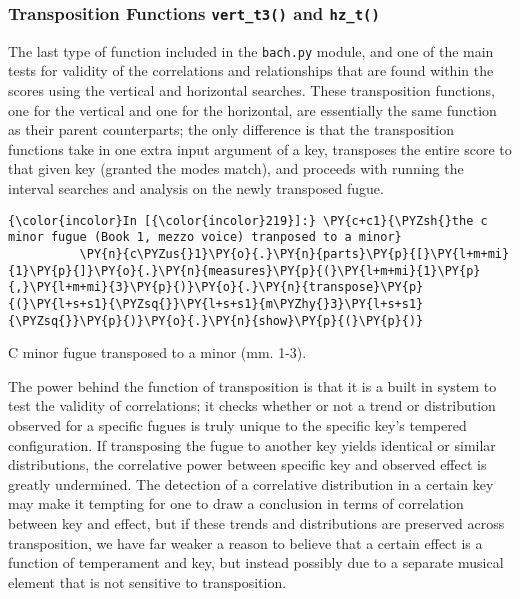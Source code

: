 \subsubsection{\texorpdfstring{Transposition Functions
\texttt{vert\_t3()} and
\texttt{hz\_t()}}{Transposition Functions vert\_t3() and hz\_t()}}\label{transposition-functions-vert_t3-and-hz_t}

The last type of function included in the \texttt{bach.py} module, and
one of the main tests for validity of the correlations and relationships
that are found within the scores using the vertical and horizontal
searches. These transposition functions, one for the vertical and one
for the horizontal, are essentially the same function as their parent
counterparts; the only difference is that the transposition functions
take in one extra input argument of a key, transposes the entire score
to that given key (granted the modes match), and proceeds with running
the interval searches and analysis on the newly transposed fugue.


    \begin{Verbatim}[commandchars=\\\{\}]
{\color{incolor}In [{\color{incolor}219}]:} \PY{c+c1}{\PYZsh{}the c minor fugue (Book 1, mezzo voice) tranposed to a minor}
          \PY{n}{c\PYZus{}1}\PY{o}{.}\PY{n}{parts}\PY{p}{[}\PY{l+m+mi}{1}\PY{p}{]}\PY{o}{.}\PY{n}{measures}\PY{p}{(}\PY{l+m+mi}{1}\PY{p}{,}\PY{l+m+mi}{3}\PY{p}{)}\PY{o}{.}\PY{n}{transpose}\PY{p}{(}\PY{l+s+s1}{\PYZsq{}}\PY{l+s+s1}{m\PYZhy{}3}\PY{l+s+s1}{\PYZsq{}}\PY{p}{)}\PY{o}{.}\PY{n}{show}\PY{p}{(}\PY{p}{)}
\end{Verbatim}

\begin{Example}[H]
    \begin{center}
    \caption{ C minor fugue transposed to a minor (mm. 1-3). }
    \end{center}
\end{Example}
    
    The power behind the function of transposition is that it is a built in
system to test the validity of correlations; it checks whether or not a
trend or distribution observed for a specific fugues is truly unique to
the specific key's tempered configuration. If transposing the fugue to
another key yields identical or similar distributions, the correlative
power between specific key and observed effect is greatly undermined.
The detection of a correlative distribution in a certain key may make it
tempting for one to draw a conclusion in terms of correlation between
key and effect, but if these trends and distributions are preserved
across transposition, we have far weaker a reason to believe that a
certain effect is a function of temperament and key, but instead
possibly due to a separate musical element that is not sensitive to
transposition.

